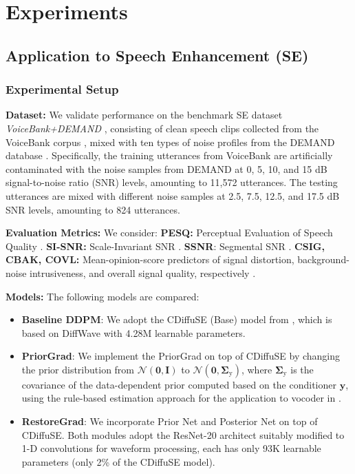 \section{Experiments}
\label{sec: exp}

\subsection{Application to Speech Enhancement (SE)}

\subsubsection{Experimental Setup}

\noindent\textbf{Dataset:} We validate performance on the benchmark SE dataset \textit{VoiceBank+DEMAND} \citep{valentini2016investigating}, consisting of clean speech clips collected from the VoiceBank corpus \citep{veaux2013voice}, mixed with ten types of noise profiles from the DEMAND database \citep{thiemann2013diverse}. Specifically, the training utterances from VoiceBank are artificially contaminated with the noise samples from DEMAND at 0, 5, 10, and 15 dB signal-to-noise ratio (SNR) levels, amounting to 11,572 utterances. The testing utterances are mixed with different noise samples at 2.5, 7.5, 12.5, and 17.5 dB  SNR levels, amounting to 824 utterances. 

\noindent\textbf{Evaluation Metrics:} We consider: \textbf{PESQ:} Perceptual Evaluation of Speech Quality \citep{itu862}. \textbf{SI-SNR:} Scale-Invariant SNR \citep{le2019sdr}. \textbf{SSNR}: Segmental SNR \cite{hu2007evaluation}. \textbf{CSIG, CBAK, COVL:} Mean-opinion-score predictors of signal distortion, background-noise intrusiveness, and overall signal quality, respectively \citep{hu2007evaluation}.

\noindent\textbf{Models:} The following models are compared:
\begin{itemize}[leftmargin=*]
\vspace{-0.15cm}
    \item \textbf{Baseline DDPM}: We adopt the CDiffuSE (Base) model from \citet{lu2022conditional}, which is based on DiffWave \citep{kong2020diffwave} with 4.28M learnable parameters. 
    \item \textbf{PriorGrad}: We implement the PriorGrad \citep{lee2021priorgrad} on top of CDiffuSE by changing the prior distribution from $\mathcal{N}(\mathbf{0},\mathbf{I})$ to $\mathcal{N}(\mathbf{0},\boldsymbol{\Sigma}_{\text{y}})$, where $\boldsymbol{\Sigma}_{\text{y}}$ is the covariance of the data-dependent prior computed based on the conditioner $\mathbf{y}$, using the rule-based estimation approach for the application to vocoder in \citet{lee2021priorgrad}.
    \item \textbf{RestoreGrad}: We incorporate Prior Net and Posterior Net on top of CDiffuSE. Both modules adopt the ResNet-20 architect \citep{he2016deep} suitably modified to 1-D convolutions for waveform processing, each has only 93K learnable parameters (only 2\% of the CDiffuSE model).
\end{itemize}


